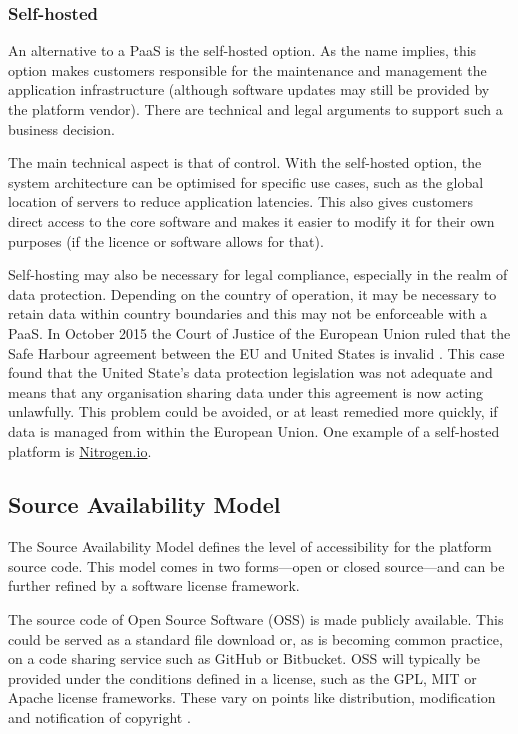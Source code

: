       \subsubsection{Self-hosted}
        An alternative to a PaaS is the self-hosted option. As the name implies, this option makes customers responsible for the maintenance and management the application infrastructure (although software updates may still be provided by the platform vendor). There are technical and legal arguments to support such a business decision.

        The main technical aspect is that of control. With the self-hosted option, the system architecture can be optimised for specific use cases, such as the global location of servers to reduce application latencies. This also gives customers direct access to the core software and makes it easier to modify it for their own purposes (if the licence or software allows for that).

        Self-hosting may also be necessary for legal compliance, especially in the realm of data protection. Depending on the country of operation, it may be necessary to retain data within country boundaries and this may not be enforceable with a PaaS. In October 2015 the Court of Justice of the European Union ruled that the Safe Harbour agreement between the EU and United States is invalid \citep{C362/14}. This case found that the United State's data protection legislation was not adequate and means that any organisation sharing data under this agreement is now acting unlawfully. This problem could be avoided, or at least remedied more quickly, if data is managed from within the European Union. One example of a self-hosted platform is \href{http://nitrogen.io/}{Nitrogen.io}.

    \subsection{Source Availability Model}
      The Source Availability Model defines the level of accessibility for the platform source code. This model comes in two forms---open or closed source---and can be further refined by a software license framework.

      The source code of Open Source Software (OSS) is made publicly available. This could be served as a standard file download or, as is becoming common practice, on a code sharing service such as GitHub or Bitbucket. OSS will typically be provided under the conditions defined in a license, such as the GPL, MIT or Apache license frameworks. These vary on points like distribution, modification and notification of copyright \citep{license:2015}.


